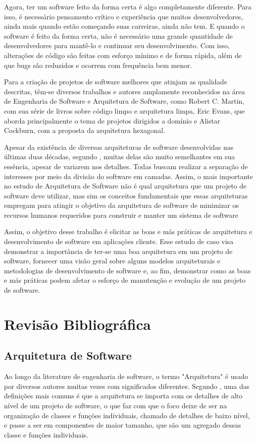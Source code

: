 \documentclass[12pt, %
openright, 
oneside, %
a4paper,    %
brazil]{facom-ufu-abntex2}
\begin{document}
Agora, ter um software feito da forma certa é algo completamente diferente. Para isso, é necessário pensamento crítico e experiência que muitos desenvolvedores, ainda mais quando estão começando suas carreiras, ainda não tem. E quando o software é feito da forma certa, não é necessário uma grande quantidade de desenvolvedores para mantê-lo e continuar seu desenvolvimento. Com isso, alterações de código são feitas com esforço mínimo e de forma rápida, além de que bugs são reduzidos e ocorrem com frequência bem menor\cite{Martin17}.

Para a criação de projetos de software melhores que atinjam as qualidade descritas, têm-se diversos trabalhos e autores amplamente reconhecidos na área de Engenharia de Software e Arquitetura de Software, como Robert C. Martin, com sua série de livros sobre código limpo e arquitetura limpa, Eric Evans, que aborda principalmente o tema de projetos dirigidos a domínio e Alistar Cockburn, com a proposta da arquitetura hexagonal.

Apesar da existência de diversas arquiteturas de software desenvolvidas nas últimas duas décadas, segundo , muitas delas são muito semelhantes em sua essência, apesar de variarem nos detalhes. Todas buscam realizar a separação de interesses por meio da divisão do software em camadas. Assim, o mais importante no estudo de Arquitetura de Software não é qual arquitetura que um projeto de software deve utilizar, mas sim os conceitos fundamentais que essas arquiteturas empregam para atingir o objetivo da arquitetura de software de minimizar os recursos humanos requeridos para construir e manter um sistema de software\cite{Martin17}

Assim, o objetivo desse trabalho é elicitar as boas e más práticas de arquitetura e desenvolvimento de software em aplicações cliente. Esse estudo de caso visa demonstrar a importância de ter-se uma boa arquitetura em um projeto de software, fornecer uma visão geral sobre alguns modelos arquiteturais e metodologias de desenvolvimento de software e, ao fim, demonstrar como as boas e más práticas podem afetar o esforço de manutenção e evolução de um projeto de software.

\chapter{Revisão Bibliográfica}


\section{Arquitetura de Software}
Ao longo da literature de engenharia de software, o termo "Arquitetura" é usado por diversos autores muitas vezes com significados diferentes. Segundo , uma das definições mais comuns é que a arquitetura se importa com os detalhes de alto nível de um projeto de software, o que faz com que o foco deixe de ser na organização de classes e funções individuais, chamado de detalhes de baixo nível, e passe a ser em componentes de maior tamanho, que são um agregado dessas classe e funções individuais.
\end{document}
